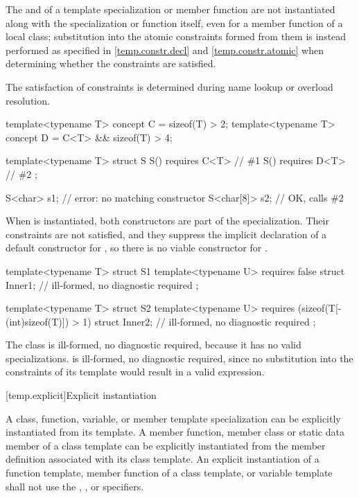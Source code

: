 \pnum
The  and 
of a template specialization or member function
are not instantiated along with the specialization or function itself,
even for a member function of a local class;
substitution into the atomic constraints formed from them is instead performed
as specified in \ref{temp.constr.decl} and \ref{temp.constr.atomic}
when determining whether the constraints are satisfied.
\begin{note}
The satisfaction of constraints is determined during name lookup or overload
resolution.
\end{note}
\begin{example}
\begin{codeblock}
template<typename T> concept C = sizeof(T) > 2;
template<typename T> concept D = C<T> && sizeof(T) > 4;

template<typename T> struct S {
  S() requires C<T> { }         // \#1
  S() requires D<T> { }         // \#2
};

S<char> s1;                     // error: no matching constructor
S<char[8]> s2;                  // OK, calls \#2
\end{codeblock}
When  is instantiated, both constructors are part of the
specialization. Their constraints are not satisfied, and
they suppress the implicit declaration of a default constructor for
, so there is no viable constructor
for .
\end{example}
\begin{example}
\begin{codeblock}
template<typename T> struct S1 {
  template<typename U>
    requires false
  struct Inner1;                // ill-formed, no diagnostic required
};

template<typename T> struct S2 {
  template<typename U>
    requires (sizeof(T[-(int)sizeof(T)]) > 1)
  struct Inner2;                // ill-formed, no diagnostic required
};
\end{codeblock}
The class  is ill-formed, no diagnostic required, because
it has no valid specializations.
 is ill-formed, no diagnostic required, since no substitution into
the constraints of its  template would result in a valid
expression.
\end{example}

[temp.explicit]{Explicit instantiation}

\pnum
{}%
%
A class, function, variable, or member template specialization can be explicitly
instantiated from its template.
A member function, member class or static data member of a class template can
be explicitly instantiated from the member definition associated with its class
template.
An explicit instantiation of a
function template,
member function of a class template, or
variable template
shall not
use the , , or  specifiers.

